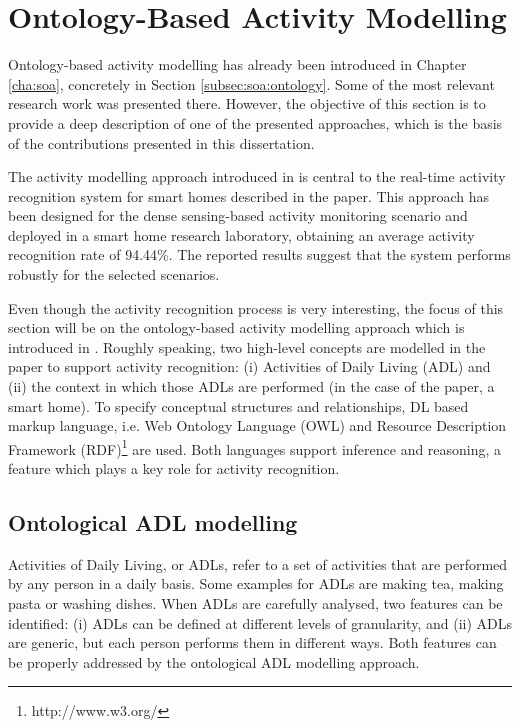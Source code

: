 \section{Ontology-Based Activity Modelling}
\label{sec:approach:ontology}

Ontology-based activity modelling has already been introduced in Chapter \ref{cha:soa}, concretely in Section \ref{subsec:soa:ontology}. Some of the most relevant research work was presented there. However, the objective of this section is to provide a deep description of one of the presented approaches, which is the basis of the contributions presented in this dissertation.

The activity modelling approach introduced in \cite{Chen2012a} is central to the real-time activity recognition system for smart homes described in the paper. This approach has been designed for the dense sensing-based activity monitoring scenario and deployed in a smart home research laboratory, obtaining an average activity recognition rate of 94.44\%. The reported results suggest that the system performs robustly for the selected scenarios.

Even though the activity recognition process is very interesting, the focus of this section will be on the ontology-based activity modelling approach which is introduced in \cite{Chen2012a}. Roughly speaking, two high-level concepts are modelled in the paper to support activity recognition: (i) Activities of Daily Living (ADL) and (ii) the context in which those ADLs are performed (in the case of the paper, a smart home). To specify conceptual structures and relationships, DL based markup language, i.e. Web Ontology Language (OWL) and Resource Description Framework (RDF)\footnote{http://www.w3.org/} are used. Both languages support inference and reasoning, a feature which plays a key role for activity recognition. 

\subsection{Ontological ADL modelling}
Activities of Daily Living, or ADLs, refer to a set of activities that are performed by any person in a daily basis. Some examples for ADLs are making tea, making pasta or washing dishes. When ADLs are carefully analysed, two features can be identified: (i) ADLs can be defined at different levels of granularity, and (ii) ADLs are generic, but each person performs them in different ways. Both features can be properly addressed by the ontological ADL modelling approach.

